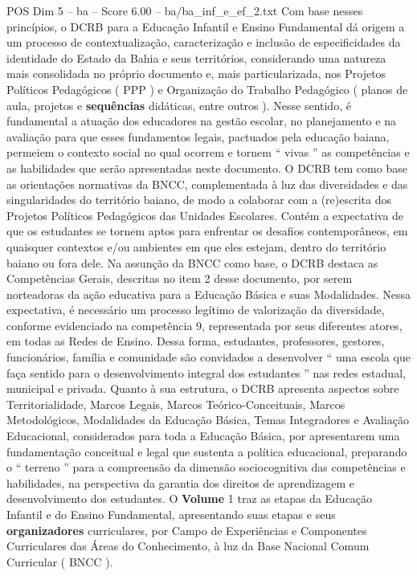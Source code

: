 \begin{textsample}{POS Dim 5 – ba – Score 6.00 – ba/ba\_inf\_e\_ef\_2.txt}
Com base nesses princípios, o DCRB para a Educação Infantil e Ensino Fundamental dá origem a um processo de contextualização, caracterização e inclusão de especificidades da identidade do Estado da Bahia e seus territórios, considerando uma natureza mais consolidada no próprio documento e, mais particularizada, nos Projetos Políticos Pedagógicos ( PPP ) e Organização do Trabalho Pedagógico ( planos de aula, projetos e \textbf{sequências} didáticas, entre outros ).
Nesse sentido, é fundamental a atuação dos educadores na gestão escolar, no planejamento e na avaliação para que esses fundamentos legais, pactuados pela educação baiana, permeiem o contexto social no qual ocorrem e tornem “ vivas ” as competências e as habilidades que serão apresentadas neste documento.
O DCRB tem como base as orientações normativas da BNCC, complementada à luz das diversidades e das singularidades do território baiano, de modo a colaborar com a (re)escrita dos Projetos Políticos Pedagógicos das Unidades Escolares.
Contém a expectativa de que os estudantes se tornem aptos para enfrentar os desafios contemporâneos, em quaisquer contextos e/ou ambientes em que eles estejam, dentro do território baiano ou fora dele.
Na assunção da BNCC como base, o DCRB destaca as Competências Gerais, descritas no item 2 desse documento, por serem norteadoras da ação educativa para a Educação Básica e suas Modalidades.
Nessa expectativa, é necessário um processo legítimo de valorização da diversidade, conforme evidenciado na competência 9, representada por seus diferentes atores, em todas as Redes de Ensino.
Dessa forma, estudantes, professores, gestores, funcionários, família e comunidade são convidados a desenvolver “ uma escola que faça sentido para o desenvolvimento integral dos estudantes ” nas redes estadual, municipal e privada.
Quanto à sua estrutura, o DCRB apresenta aspectos sobre Territorialidade, Marcos Legais, Marcos Teórico-Conceituais, Marcos Metodológicos, Modalidades da Educação Básica, Temas Integradores e Avaliação Educacional, considerados para toda a Educação Básica, por apresentarem uma fundamentação conceitual e legal que sustenta a política educacional, preparando o “ terreno ” para a compreensão da dimensão sociocognitiva das competências e habilidades, na perspectiva da garantia dos direitos de aprendizagem e desenvolvimento dos estudantes.
O \textbf{Volume} 1 traz as etapas da Educação Infantil e do Ensino Fundamental, apresentando suas etapas e seus \textbf{organizadores} curriculares, por Campo de Experiências e Componentes Curriculares das Áreas do Conhecimento, à luz da Base Nacional Comum Curricular ( BNCC ).

\end{textsample}
